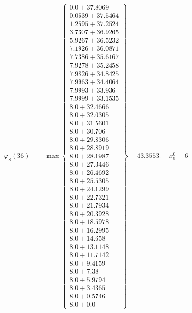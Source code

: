 \documentclass{article}
\begin{document}
\begin{align*}
\varphi_{8}(36) &= \max \left\{ \begin{array}{c}
0.0 + 37.8069 \\
 0.0539 + 37.5464 \\
 1.2595 + 37.2524 \\
 3.7307 + 36.9265 \\
 5.9267 + 36.5232 \\
 7.1926 + 36.0871 \\
 7.7386 + 35.6167 \\
 7.9278 + 35.2458 \\
 7.9826 + 34.8425 \\
 7.9963 + 34.4064 \\
 7.9993 + 33.936 \\
 7.9999 + 33.1535 \\
 8.0 + 32.4666 \\
 8.0 + 32.0305 \\
 8.0 + 31.5601 \\
 8.0 + 30.706 \\
 8.0 + 29.8306 \\
 8.0 + 28.8919 \\
 8.0 + 28.1987 \\
 8.0 + 27.3446 \\
 8.0 + 26.4692 \\
 8.0 + 25.5305 \\
 8.0 + 24.1299 \\
 8.0 + 22.7321 \\
 8.0 + 21.7934 \\
 8.0 + 20.3928 \\
 8.0 + 18.5978 \\
 8.0 + 16.2995 \\
 8.0 + 14.658 \\
 8.0 + 13.1148 \\
 8.0 + 11.7142 \\
 8.0 + 9.4159 \\
 8.0 + 7.38 \\
 8.0 + 5.9794 \\
 8.0 + 3.4365 \\
 8.0 + 0.5746 \\
 8.0 + 0.0
\end{array} \right\}=43.3553, \quad x_{8}^0=6\\
  
 \\ 
\end{align*}
\end{document}
